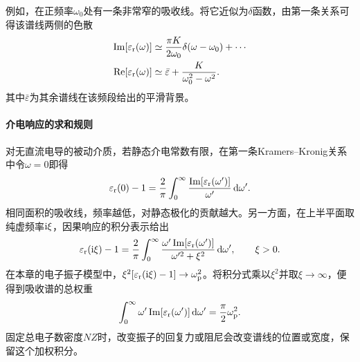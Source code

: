 例如，在正频率$\omega_0$处有一条非常窄的吸收线。将它近似为$\delta$函数，由第一条关系可得该谱线两侧的色散
\begin{align*}
    \operatorname{Im}[\varepsilon_\mathrm r(\omega)] &\simeq \frac{\pi K}{2\omega_0}\delta(\omega - \omega_0) + \cdots\\
    \operatorname{Re}[\varepsilon_\mathrm r(\omega)] &\simeq \bar\varepsilon + \frac K{\omega_0^2 - \omega^2}.
\end{align*}
其中$\bar\varepsilon$为其余谱线在该频段给出的平滑背景。

\paragraph{介电响应的求和规则}
对无直流电导的被动介质，若静态介电常数有限，在第一条Kramers--Kronig关系中令$\omega = 0$即得
\begin{equation}
    \label{eq:ed-static-dispersion-sum}
    \varepsilon_\mathrm r(0) - 1
    = \frac2\pi\int_0^\infty\frac{\operatorname{Im}[\varepsilon_\mathrm r(\omega')]}{\omega'}\mathop{}\!\mathrm{d}\omega'.
\end{equation}
相同面积的吸收线，频率越低，对静态极化的贡献越大。另一方面，在上半平面取纯虚频率$\mathrm{i}\xi$，因果响应的积分表示给出
\begin{equation}
    \label{eq:ed-imaginary-frequency-permittivity}
    \varepsilon_\mathrm r(\mathrm{i}\xi) - 1
    = \frac2\pi\int_0^\infty\frac{\omega'\operatorname{Im}[\varepsilon_\mathrm r(\omega')]}{\omega'^2 + \xi^2}\mathop{}\!\mathrm{d}\omega',
    \qquad \xi > 0.
\end{equation}
在本章的电子振子模型中，$\xi^2[\varepsilon_\mathrm r(\mathrm{i}\xi) - 1] \to \omega_{\mathrm p}^2$。将积分式乘以$\xi^2$并取$\xi \to \infty$，便得到吸收谱的总权重
\begin{equation}
    \int_0^\infty\omega'\operatorname{Im}[\varepsilon_\mathrm r(\omega')]\mathop{}\!\mathrm{d}\omega'
    = \frac\pi2\omega_{\mathrm p}^2.
\end{equation}
固定总电子数密度$NZ$时，改变振子的回复力或阻尼会改变谱线的位置或宽度，保留这个加权积分。

